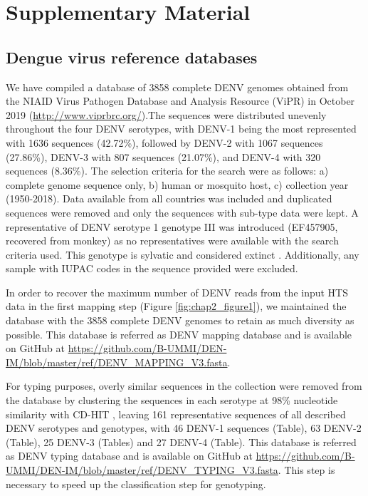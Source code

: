 \section{Supplementary Material}

\subsection{Dengue virus reference databases} \label{chap4_sup_database}

We have compiled a database of 3858 complete DENV genomes obtained from the NIAID Virus Pathogen Database and Analysis Resource (ViPR) in October 2019 \citep{pickett_virus_2012} (\url{http://www.viprbrc.org/}).The sequences were distributed unevenly throughout the four DENV serotypes, with DENV-1 being the most represented with 1636 sequences (42.72\%), followed by DENV-2 with 1067 sequences (27.86\%), DENV-3 with 807 sequences (21.07\%), and DENV-4 with 320 sequences (8.36\%). The selection criteria for the search were as follows: a) complete genome sequence only, b) human or mosquito host, c) collection year (1950-2018). Data available from all countries was included and duplicated sequences were removed and only the sequences with sub-type data were kept. A representative of DENV serotype 1 genotype III was introduced (EF457905, recovered from monkey) as no representatives were available with the search criteria used. This genotype is sylvatic and considered extinct \citep{villabona-arenas_worldwide_2013, vasilakis_history_2008}. Additionally, any sample with IUPAC codes in the sequence provided were excluded. 

In order to recover the maximum number of DENV reads from the input HTS data in the first mapping step (Figure \ref{fig:chap2_figure1}), we maintained the database with the 3858 complete DENV genomes to retain as much diversity as possible. This database is referred as DENV mapping database and is available on GitHub at \url{https://github.com/B-UMMI/DEN-IM/blob/master/ref/DENV_MAPPING_V3.fasta}. 

For typing purposes, overly similar sequences in the collection were removed from the database by clustering the sequences in each serotype at 98\% nucleotide similarity with CD-HIT \citep{li_cd-hit_2006}, leaving 161 representative sequences of all described DENV serotypes and genotypes, with 46 DENV-1 sequences (Table), 63 DENV-2 (Table), 25 DENV-3 (Tables) and 27 DENV-4 (Table). This database is referred as DENV typing database and is available on GitHub at \url{https://github.com/B-UMMI/DEN-IM/blob/master/ref/DENV_TYPING_V3.fasta}. This step is necessary to speed up the classification step for genotyping.

